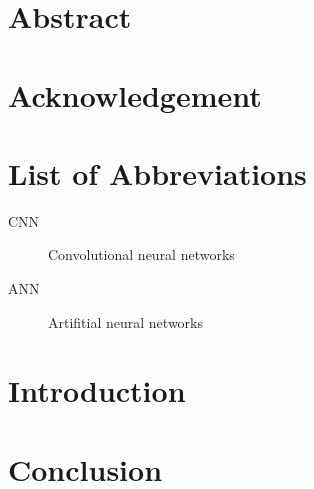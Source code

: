\documentclass[a4paper, 12pt, oneside]{book}
\begin{document}
\frontmatter
\chapter*{Abstract}
\blindtext
{}
\nopagebreak

\chapter*{Acknowledgement}
\blindtext
{}

\tableofcontents
{}
\listoftables
{}
\listoffigures
{}

\chapter{List of Abbreviations}

\begin{description}

  \item[CNN] Convolutional neural networks
  \item[ANN] Artifitial neural networks

\end{description}

\mainmatter

\chapter*{Introduction}
\blindtext[5]





\chapter*{Conclusion}
\blindtext[5]


\appendix
\clearpage
{}
\addappheadtotoc


\backmatter

\nocite{*}


\end{document}
